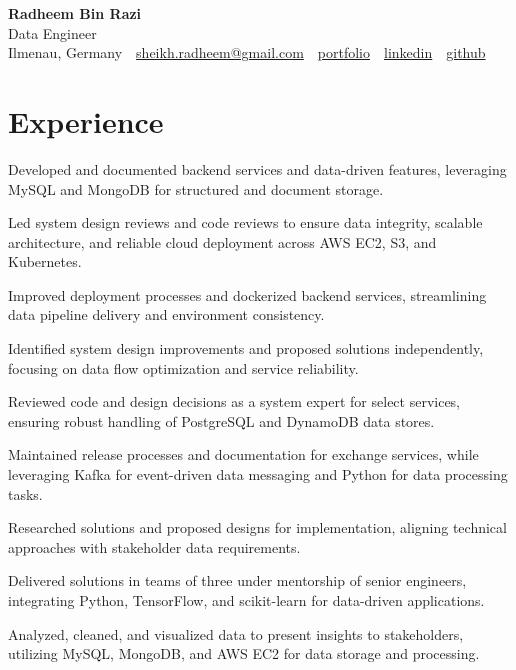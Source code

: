 \documentclass[11pt,a4paper]{resume}
\makeatletter
\newcommand{\Portfolio}{https://radheem.github.io/my-cv}
\newcommand{\PortfolioText}{portfolio}
\newcommand{\GitHub}{https://github.com/radheem}
\newcommand{\LinkedIn}{https://www.linkedin.com/in/radheem-razi}
\newcommand{\Email}{sheikh.radheem@gmail.com}
\makeatother
\begin{document}
\begin{center}
  {\huge\bfseries Radheem Bin Razi}\\[3pt]
  {\large Data Engineer}\\[6pt]
  \small
  Ilmenau, Germany \,\textbar\,
  \href{mailto:\Email}{\Email} \,\textbar\,
  \href{\Portfolio}{\PortfolioText} \,\textbar\,
  \href{\LinkedIn}{linkedin} \,\textbar\,
  \href{\GitHub}{github}
\end{center}
\vspace{2pt}

\section{Experience}

\bullets
  \item Developed and documented backend services and data-driven features, leveraging MySQL and MongoDB for structured and document storage.
  \item Led system design reviews and code reviews to ensure data integrity, scalable architecture, and reliable cloud deployment across AWS EC2, S3, and Kubernetes.
  \item Improved deployment processes and dockerized backend services, streamlining data pipeline delivery and environment consistency.
\bulletsend
\vspace{3pt}
\bullets
  \item Identified system design improvements and proposed solutions independently, focusing on data flow optimization and service reliability.
  \item Reviewed code and design decisions as a system expert for select services, ensuring robust handling of PostgreSQL and DynamoDB data stores.
  \item Maintained release processes and documentation for exchange services, while leveraging Kafka for event-driven data messaging and Python for data processing tasks.
\bulletsend
\vspace{3pt}
\bullets
  \item Researched solutions and proposed designs for implementation, aligning technical approaches with stakeholder data requirements.
  \item Delivered solutions in teams of three under mentorship of senior engineers, integrating Python, TensorFlow, and scikit-learn for data-driven applications.
  \item Analyzed, cleaned, and visualized data to present insights to stakeholders, utilizing MySQL, MongoDB, and AWS EC2 for data storage and processing.
\bulletsend
\vspace{3pt}
\end{document}
